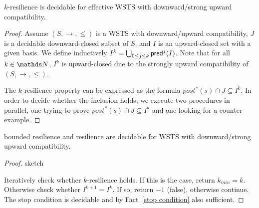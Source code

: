 \begin{theorem}
{\sc $k$-resilience} is decidable for effective WSTS with downward/strong upward compatibility.
\end{theorem}
\begin{proof}

Assume  $(S, \rightarrow, \leq)$ is a WSTS with downward/upward compatibility, $J$ is a decidable downward-closed subset of $S$, and $I$ is an upward-closed set with a given basis.
We define inductively
$I^{k} = \bigcup_{0 \leq j \leq k} \textsf{pred}^j(I)$. Note that for all $k \in \N$, $I^k$ is upward-closed due to
the strongly upward compatibility of $(S, \rightarrow, \leq)$.


The $k$-resilience property can be expressed as the formula
$ post^*(s) \cap J \subseteq I^k$. In order to decide whether the inclusion holds, we execute two procedures in parallel, one trying to prove $ post^*(s)\cap J \subseteq I^k$ 
and one looking for a counter example.

\end{proof}


\begin{theorem}
{\sc bounded resilience} and {\sc resilience} are decidable for WSTS with downward/strong upward compatibility.
\end{theorem}

\begin{proof}{sketch}

Iteratively check whether $k$-resilience holds. 
If this is the case, return $k_{min} = k$. Otherwise check whether 
$I^{k+1} = I^k$. If so, return $-1$ (false), otherwise
continue.
The stop condition is decidable
and by Fact~\ref{stop condition} also sufficient. 
\end{proof}
%
%


